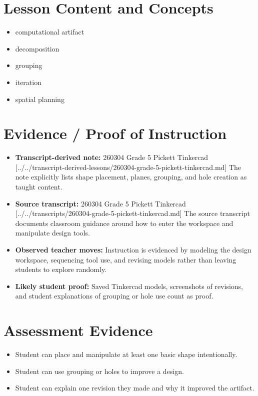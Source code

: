 \documentclass[11pt]{article}
\begin{document}
\section*{Lesson Content and Concepts}
\begin{itemize}[leftmargin=*]
\item computational artifact
\item decomposition
\item grouping
\item iteration
\item spatial planning
\end{itemize}

\section*{Evidence / Proof of Instruction}
\begin{itemize}[leftmargin=*]
\item \textbf{Transcript-derived note:} 260304 Grade 5 Pickett Tinkercad [../../transcript-derived-lessons/260304-grade-5-pickett-tinkercad.md] The note explicitly lists shape placement, planes, grouping, and hole creation as taught content.
\item \textbf{Source transcript:} 260304 Grade 5 Pickett Tinkercad [../../transcripts/260304-grade-5-pickett-tinkercad.md] The source transcript documents classroom guidance around how to enter the workspace and manipulate design tools.
\item \textbf{Observed teacher moves:} Instruction is evidenced by modeling the design workspace, sequencing tool use, and revising models rather than leaving students to explore randomly.
\item \textbf{Likely student proof:} Saved Tinkercad models, screenshots of revisions, and student explanations of grouping or hole use count as proof.
\end{itemize}

\section*{Assessment Evidence}
\begin{itemize}[leftmargin=*]
\item Student can place and manipulate at least one basic shape intentionally.
\item Student can use grouping or holes to improve a design.
\item Student can explain one revision they made and why it improved the artifact.
\end{itemize}
\end{document}
